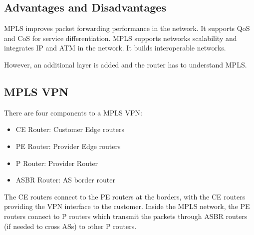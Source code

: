 \subsection{Advantages and Disadvantages}
MPLS improves packet forwarding performance in the network. It supports QoS and CoS for service differentiation. MPLS supports networks scalability and integrates IP and ATM in the network. It builds interoperable networks.

However, an additional layer is added and the router has to understand MPLS. 

\subsection{MPLS VPN}
There are four components to a MPLS VPN:
\begin{itemize}
    \item CE Router: Customer Edge routers
    \item PE Router: Provider Edge routers
    \item P Router: Provider Router
    \item ASBR Router: AS border router
\end{itemize}

The CE routers connect to the PE routers at the borders, with the CE routers providing the VPN interface to the customer. Inside the MPLS network, the PE routers connect to P routers which transmit the packets through ASBR routers (if needed to cross ASs) to other P routers.
